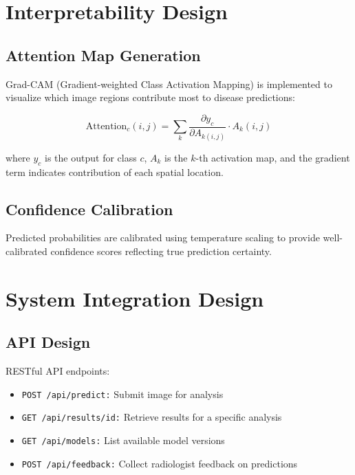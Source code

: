 {\section{Interpretability Design}

\subsection{Attention Map Generation}

Grad-CAM (Gradient-weighted Class Activation Mapping) is implemented to visualize which image regions contribute most to disease predictions:

\begin{equation}
\text{Attention}_{c}(i,j) = \sum_k \frac{\partial y_c}{\partial A_{k(i,j)}} \cdot A_k(i,j)
\end{equation}

where $y_c$ is the output for class $c$, $A_k$ is the $k$-th activation map, and the gradient term indicates contribution of each spatial location.

\subsection{Confidence Calibration}

Predicted probabilities are calibrated using temperature scaling to provide well-calibrated confidence scores reflecting true prediction certainty.

\section{System Integration Design}

\subsection{API Design}

RESTful API endpoints:

\begin{itemize}
    \item \texttt{POST /api/predict:} Submit image for analysis
    \item \texttt{GET /api/results/{id}:} Retrieve results for a specific analysis
    \item \texttt{GET /api/models:} List available model versions
    \item \texttt{POST /api/feedback:} Collect radiologist feedback on predictions
\end{itemize}

}
